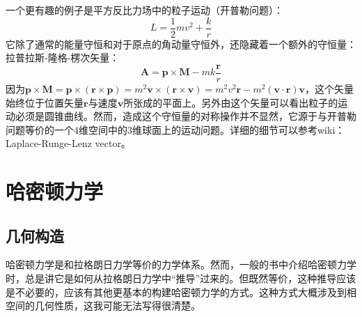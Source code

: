 \documentclass{ctexart}
\begin{document}
一个更有趣的例子是平方反比力场中的粒子运动（开普勒问题）：
\begin{equation}
L=\frac{1}{2}mv^2+\frac{k}{r}
\end{equation}
它除了通常的能量守恒和对于原点的角动量守恒外，还隐藏着一个额外的守恒量：拉普拉斯-隆格-楞次矢量：
\begin{equation}
\bm{A}=\bm{p}\times\bm{M}-mk\frac{\bm{r}}{r}
\end{equation}
因为$\bm{p}\times\bm{M}=\bm{p}\times(\bm{r}\times\bm{p})=m^2\bm{v}\times(\bm{r}\times\bm{v})=m^2v^2\bm{r}-m^2(\bm{v}\cdot\bm{r})\bm{v}$，这个矢量始终位于位置矢量$\bm{r}$与速度$\bm{v}$所张成的平面上。另外由这个矢量可以看出粒子的运动必须是圆锥曲线。然而，造成这个守恒量的对称操作并不显然，它源于与开普勒问题等价的一个4维空间中的3维球面上的运动问题。详细的细节可以参考wiki：Laplace-Runge-Lenz vector。

\section{哈密顿力学}

\subsection{几何构造}

哈密顿力学是和拉格朗日力学等价的力学体系。然而，一般的书中介绍哈密顿力学时，总是讲它是如何从拉格朗日力学中“推导”过来的。但既然等价，这种推导应该是不必要的，应该有其他更基本的构建哈密顿力学的方式。这种方式大概涉及到相空间的几何性质，这我可能无法写得很清楚。
\end{document}
